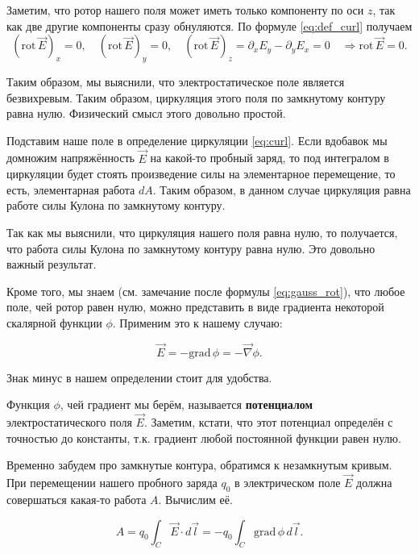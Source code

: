 \documentclass[11pt,a4paper]{article}
\numberwithin{equation}{section}
\newcommand{\pt}{\partial}
\newcommand{\grad}{\mathrm{grad}\,}
\newcommand{\rot}{\mathrm{rot}\,}
\newcommand{\vn}{\vec{\nabla}}
\begin{document}
Заметим, что ротор нашего поля может иметь только компоненту по оси
$z$, так как две другие компоненты сразу обнуляются. По формуле
\eqref{eq:def_curl} получаем
\begin{equation}
  \label{eq:rot_electrostatics_2}
 \left( \rot \vec{E} \right)_x =0, \quad  \left( \rot \vec{E}
 \right)_y =0, \quad \left( \rot \vec{E} \right)_z = \pt_x E_y - \pt_y
 E_x = 0 \quad \Rightarrow \rot \vec{E} =0.
\end{equation}

Таким образом, мы выяснили, что электростатическое поле является
безвихревым. Таким образом, циркуляция этого поля по замкнутому
контуру равна нулю. Физический смысл этого довольно простой. 

Подставим наше поле в определение циркуляции \eqref{eq:curl}. Если
вдобавок мы домножим напряжённость $\vec{E}$ на какой-то пробный
заряд, то под интегралом в циркуляции будет стоять произведение силы
на элементарное перемещение, то есть, элементарная работа $dA$. Таким
образом, в данном случае циркуляция равна работе силы Кулона по
замкнутому контуру. 

Так как мы выяснили, что циркуляция нашего поля равна нулю, то
получается, что работа силы Кулона по замкнутому контуру равна
нулю. Это довольно важный результат. 

Кроме того, мы знаем (см. замечание после формулы
\eqref{eq:gauss_rot}), что любое поле, чей ротор равен нулю, можно
представить в виде градиента некоторой скалярной функции
$\phi$. Применим это к нашему случаю:

\begin{equation}
  \label{eq:def_potential}
  \vec{E}  = -\grad \phi = -\vn \phi.
\end{equation}

Знак минус в нашем определении стоит для удобства.

Функция $\phi$, чей градиент мы берём, называется \textbf{потенциалом}
электростатического поля $\vec{E}$. Заметим, кстати, что этот
потенциал определён с точностью до константы, т.к. градиент любой
постоянной функции равен нулю. 

Временно забудем про замкнутые контура, обратимся к незамкнутым
кривым. При перемещении нашего пробного заряда $q_0$ в электрическом поле
$\vec{E}$ должна совершаться какая-то работа $A$. Вычислим её. 

\begin{equation}
  \label{eq:work_statics_1}
  A = q_0 \int_C \vec{E} \cdot d\vec{l} = -q_0 \int_C \grad \phi\, d\vec{l}.
\end{equation}
\end{document}
